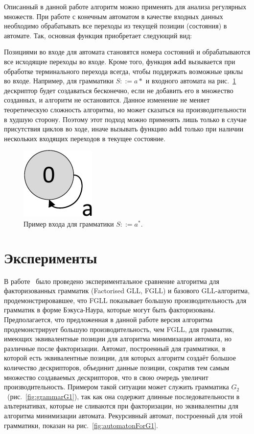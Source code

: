 Описанный в данной работе алгоритм можно применять для анализа регулярных множеств.
При работе с конечным автоматом в качестве входных данных необходимо обрабатывать все переходы из текущей позиции (состояния) в автомате.
Так, основная функция приобретает следующий вид:

Позициями во входе для автомата становятся номера состояний и обрабатываются все исходящие переходы во входе. Кроме того,    
функция \textbf{add} вызывается при обработке терминального перехода всегда, чтобы поддержать возможные циклы во входе.
Например, для грамматики $S ::= a*$ и входного автомата на рис.~\ref{graphEx}
дескриптор будет создаваться бесконечно, если не добавить его в множество созданных, и алгоритм не остановится.
Данное изменение не меняет теоретическую сложность алгоритма, но может сказаться на производительности в худшую сторону.
Поэтому этот подход можно применять лишь только в случае присутствия циклов во ходе, иначе вызывать функцию \textbf{add}
только при наличии нескольких входящих переходов в текущее состояние.

\begin{figure}%
	\centering
	\includegraphics[scale=.5]{./Gorohov/pictures/graphEx.pdf}
	\caption{Пример входа для грамматики $S ::= a^*$.}
	\label{graphEx}
\end{figure}

\section{Эксперименты}
В работе~\cite{scott2016structuring}
было проведено экспериментальное сравнение алгоритма для факторизованных грамматик (Factorised GLL, FGLL) и базового GLL-алгоритма,
продемонстрировавшее, что FGLL показывает большую производительность для грамматик в форме Бэкуса-Наура, которые могут быть факторизованы.
Предполагается, что предложенная в данной работе версия алгоритма
продемонстрирует большую производительность, чем FGLL, для грамматик, имеющих эквивалентные позиции для алгоритма минимизации автомата,
но различные после факторизации. Автомат, построенный для грамматики, в которой есть эквивалентные позиции, для которых алгоритм создаёт большое количество дескрипторов,
объединит данные позиции, сократив тем самым множество создаваемых дескрипторов,
что в свою очередь увеличит производительность. Примером такой ситуации может служить грамматика 
$G_2$~(рис.~\ref{fig:grammarG1}), так как она содержит длинные последовательности 
в альтернативах, которые не сливаются при факторизации, но эквивалентны для алгоритма минимизации автомата.
Рекурсивный автомат, построенный для этой грамматики, показан на рис.~\ref{fig:automatonForG1}.

